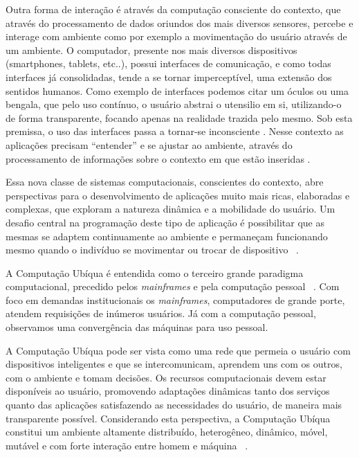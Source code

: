 \documentclass[12pt,a4paper,compsoc]{IEEEtran}
\begin{document}
  Outra forma de interação é através da computação consciente do contexto, que através do 
  processamento de dados oriundos dos mais diversos sensores, percebe e interage com ambiente como
  por exemplo a movimentação do usuário através de um ambiente. O computador, presente
  nos mais diversos dispositivos (smartphones, tablets, etc..), possui interfaces de comunicação, e
  como todas interfaces já consolidadas, tende a se tornar imperceptível, uma extensão dos sentidos
  humanos. Como exemplo de interfaces podemos citar um óculos ou uma bengala, que pelo uso 
  contínuo, o usuário abstrai o utensilio em si, utilizando-o de forma transparente, focando apenas
  na realidade trazida pelo mesmo. Sob esta premissa, o uso das interfaces passa a tornar-se
  inconsciente \cite{weiser1993}. Nesse contexto as aplicações precisam ``entender'' e se ajustar
  ao ambiente, através do processamento de informações sobre o contexto em que estão inseridas
  \cite{maciel2004}.
  
  Essa nova classe de sistemas computacionais, conscientes do contexto, abre perspectivas para o
  desenvolvimento de aplicações muito mais ricas, elaboradas e complexas, que exploram a natureza
  dinâmica e a mobilidade do usuário. Um desafio central na programação deste tipo de aplicação é
  possibilitar que as mesmas se adaptem continuamente ao ambiente e permaneçam funcionando mesmo
  quando o indivíduo se movimentar ou trocar de dispositivo ~\cite{GrimmB03, Cac08}.
  
  A Computação Ubíqua é entendida como o terceiro grande paradigma computacional, precedido pelos
  \textit{mainframes} e pela computação pessoal ~\cite{weiser1997}. Com foco em demandas 
  institucionais os \textit{mainframes}, computadores de grande porte, atendem requisições de
  inúmeros usuários. Já com a computação pessoal, observamos uma convergência das máquinas para uso
  pessoal.
  
  A Computação Ubíqua pode ser vista como uma rede que permeia o usuário com dispositivos
  inteligentes e que se intercomunicam, aprendem uns com os outros, com o ambiente e tomam
  decisões. Os recursos computacionais devem estar disponíveis ao usuário, promovendo adaptações
  dinâmicas tanto dos serviços quanto das aplicações satisfazendo as necessidades do usuário, de 
  maneira mais transparente possível. Considerando esta perspectiva, a Computação Ubíqua constitui
  um ambiente altamente distribuído, heterogêneo, dinâmico, móvel, mutável e com forte interação
  entre homem e máquina ~\cite{Augustin03}.
  
\end{document}
